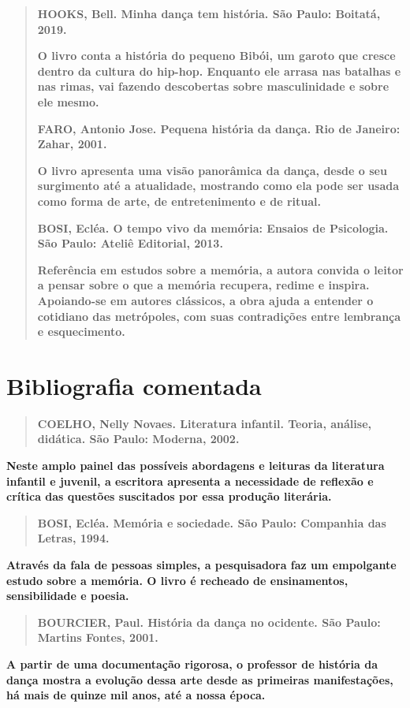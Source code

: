 \documentclass[12pt]{extarticle}
\begin{document}
\begin{quote} \textbf{HOOKS, Bell. Minha dança tem história. São Paulo:
  Boitatá, 2019.}

\textbf{O livro conta a história do pequeno Bibói, um garoto que cresce dentro
  da cultura do hip-hop. Enquanto ele arrasa nas batalhas e nas rimas, vai
  fazendo descobertas sobre masculinidade e sobre ele mesmo.}

\textbf{FARO, Antonio Jose. Pequena história da dança. Rio de Janeiro: Zahar,
  2001.}

\textbf{O livro apresenta uma visão panorâmica da dança, desde o seu surgimento
  até a atualidade, mostrando como ela pode ser usada como forma de arte, de
  entretenimento e de ritual.}

\textbf{BOSI, Ecléa. O tempo vivo da memória: Ensaios de Psicologia. São Paulo:
  Ateliê Editorial, 2013.}

\textbf{Referência em estudos sobre a memória, a autora convida o leitor a
  pensar sobre o que a memória recupera, redime e inspira. Apoiando-se em
  autores clássicos, a obra ajuda a entender o cotidiano das metrópoles, com
  suas contradições entre lembrança e esquecimento.} \end{quote}


\section{Bibliografia comentada}

\begin{quote} \textbf{COELHO, Nelly Novaes. Literatura infantil. Teoria,
análise, didática. São Paulo: Moderna, 2002.} \end{quote}

\textbf{Neste amplo painel das possíveis abordagens e leituras da literatura
infantil e juvenil, a escritora apresenta a necessidade de reflexão e crítica
das questões suscitados por essa produção literária.}

\begin{quote} \textbf{BOSI, Ecléa. Memória e sociedade. São Paulo: Companhia
das Letras, 1994.} \end{quote}

\textbf{Através da fala de pessoas simples, a pesquisadora faz um empolgante
estudo sobre a memória. O livro é recheado de ensinamentos, sensibilidade e
poesia.}

\begin{quote} \textbf{BOURCIER, Paul. História da dança no ocidente. São Paulo:
Martins Fontes, 2001.} \end{quote}

\textbf{A partir de uma documentação rigorosa, o professor de história da dança
mostra a evolução dessa arte desde as primeiras manifestações, há mais de
quinze mil anos, até a nossa época.}
\end{document}
